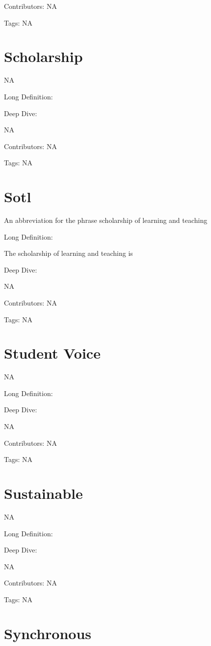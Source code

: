 \documentclass[
  letterpaper,
  DIV=11,
  numbers=noendperiod]{scrreprt}
\begin{document}
Contributors: NA

Tags: NA

\section{Scholarship}\label{scholarship}

NA

Long Definition:

Deep Dive:

NA

Contributors: NA

Tags: NA

\section{Sotl}\label{sotl}

An abbreviation for the phrase scholarship of learning and teaching

Long Definition:

The scholarship of learning and teaching is

Deep Dive:

NA

Contributors: NA

Tags: NA

\section{Student Voice}\label{student-voice}

NA

Long Definition:

Deep Dive:

NA

Contributors: NA

Tags: NA

\section{Sustainable}\label{sustainable}

NA

Long Definition:

Deep Dive:

NA

Contributors: NA

Tags: NA

\section{Synchronous}\label{synchronous}
\end{document}

